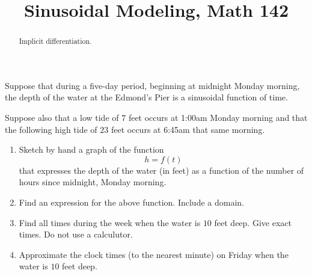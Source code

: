 \documentclass{ximera}
\title{Sinusoidal Modeling, Math 142}
\begin{document}
\begin{abstract}
Implicit differentiation.
\end{abstract}
\maketitle



\begin{question} \label{Qhhjklfghjfd}
Suppose that during a five-day period, beginning at midnight Monday morning, the depth of the water at the Edmond's Pier is a sinusoidal function of time.

Suppose also that a low tide of $7$ feet occurs at 1:00am Monday morning and that the following high tide of $23$ feet occurs at 6:45am that same morning.  

\begin{enumerate}
\item Sketch by hand a graph of the function
\[
   h = f(t)
\] 
that expresses the depth of the water (in feet) as a function of the number of hours since midnight, Monday morning.

\item Find an expression for the above function. Include a domain.

\item Find all times during the week when the water is $10$ feet deep. Give exact times. Do not use a calculutor.

\item Approximate the clock times (to the nearest minute) on Friday when the water is $10$ feet deep.

\end{enumerate}


\end{question}
\end{document}
